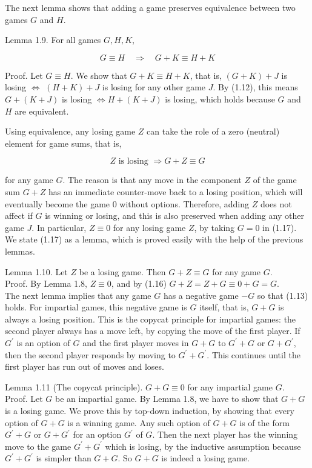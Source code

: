 \documentclass[12pt]{article}
\begin{document}
The next lemma shows that adding a game preserves equivalence between two games $G$ and $H$.

Lemma 1.9. For all games $G, H, K$,


\begin{equation*}
G \equiv H \quad \Rightarrow \quad G+K \equiv H+K \tag{1.16}
\end{equation*}


Proof. Let $G \equiv H$. We show that $G+K \equiv H+K$, that is, $(G+K)+J$ is losing $\Leftrightarrow$ $(H+K)+J$ is losing for any other game $J$. By (1.12), this means $G+(K+J)$ is losing $\Leftrightarrow H+(K+J)$ is losing, which holds because $G$ and $H$ are equivalent.

Using equivalence, any losing game $Z$ can take the role of a zero (neutral) element for game sums, that is,


\begin{equation*}
Z \text { is losing } \Rightarrow G+Z \equiv G \tag{1.17}
\end{equation*}


for any game $G$. The reason is that any move in the component $Z$ of the game sum $G+Z$ has an immediate counter-move back to a losing position, which will eventually become the game 0 without options. Therefore, adding $Z$ does not affect if $G$ is winning or losing, and this is also preserved when adding any other game $J$. In particular, $Z \equiv 0$ for any losing game $Z$, by taking $G=0$ in (1.17). We state (1.17) as a lemma, which is proved easily with the help of the previous lemmas.

Lemma 1.10. Let $Z$ be a losing game. Then $G+Z \equiv G$ for any game $G$.\\
Proof. By Lemma 1.8, $Z \equiv 0$, and by (1.16) $G+Z=Z+G \equiv 0+G=G$.\\
The next lemma implies that any game $G$ has a negative game $-G$ so that (1.13) holds. For impartial games, this negative game is $G$ itself, that is, $G+G$ is always a losing position. This is the copycat principle for impartial games: the second player always has a move left, by copying the move of the first player. If $G^{\prime}$ is an option of $G$ and the first player moves in $G+G$ to $G^{\prime}+G$ or $G+G^{\prime}$, then the second player responds by moving to $G^{\prime}+G^{\prime}$. This continues until the first player has run out of moves and loses.

Lemma 1.11 (The copycat principle). $G+G \equiv 0$ for any impartial game $G$.\\
Proof. Let $G$ be an impartial game. By Lemma 1.8, we have to show that $G+G$ is a losing game. We prove this by top-down induction, by showing that every option of $G+G$ is a winning game. Any such option of $G+G$ is of the form $G^{\prime}+G$ or $G+G^{\prime}$ for an option $G^{\prime}$ of $G$. Then the next player has the winning move to the game $G^{\prime}+G^{\prime}$ which is losing, by the inductive assumption because $G^{\prime}+G^{\prime}$ is simpler than $G+G$. So $G+G$ is indeed a losing game.
\end{document}
